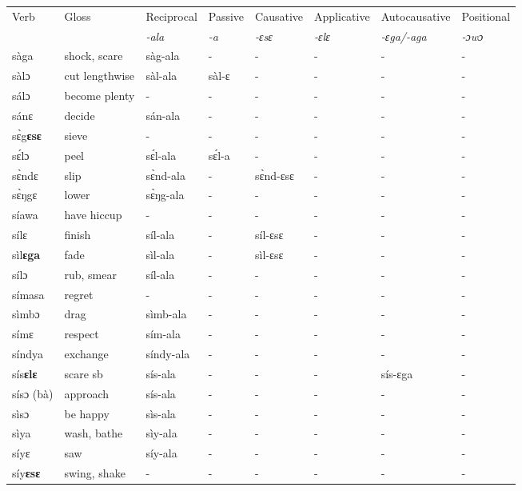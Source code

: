\begin{sidewaystable}
\begin{tabular}{llllllll}
 \lsptoprule
 Verb & Gloss & Reciprocal & Passive  & Causative  & Applicative   & Autocausative & Positional   \\
  &    & {\itshape -ala} & {\itshape -a} & {\itshape -ɛsɛ} & {\itshape -ɛlɛ} & {\itshape -ɛga/-aga}  & {\itshape -ɔwɔ}  \\
\midrule
sàga & shock, scare  & sàg-ala &  - & - &  - & - & - \\
sàlɔ & cut lengthwise & sàl-ala &  sàl-ɛ & - & - & - & - \\ 
sálɔ & become plenty & - & - & -  & - & -  & -\\
sánɛ & decide & sán-ala & -  & - & -  & - & - \\
sɛ̀g{\bfseries ɛsɛ} & sieve & - & - & - & - & - & - \\
sɛ́lɔ & peel & sɛ́l-ala & sɛ́l-a & - & - & - & - \\
sɛ̀ndɛ & slip & sɛ̀nd-ala & - & sɛ̀nd-ɛsɛ & - &  - & - \\
sɛ̀ŋgɛ & lower & sɛ̀ŋg-ala & - & - & - & - & - \\
síawa & have hiccup & - & - & - & - & - & - \\
sílɛ & finish & síl-ala & - & síl-ɛsɛ  & - &  - & - \\
sìl{\bfseries ɛga} & fade & sìl-ala & - & sìl-ɛsɛ & - &  - & - \\
sílɔ & rub, smear & síl-ala & - & - & -  & - & - \\
símasa & regret & -  & - & - & - & - & - \\
sìmbɔ & drag & sìmb-ala & - & - & -  & - &  - \\
símɛ & respect & sím-ala & - & - &  - & - &  -  \\
síndya & exchange & síndy-ala & - & - &  - & - &  - \\
sís{\bfseries ɛlɛ} & scare sb & sís-ala & - & - &  -  & sís-ɛga & - \\
sísɔ (bà) & approach & sís-ala & - & - & - & - &  -  \\
sìsɔ & be happy & sìs-ala & - & - & - & - & - \\
sìya & wash, bathe & sìy-ala & - & - & -  & - & - \\
síyɛ &  saw & síy-ala & - & - & - & - & - \\
síy{\bfseries ɛsɛ}  & swing, shake & - & - &  - &  - & - & - \\
\midrule\end{tabular}\end{sidewaystable}

